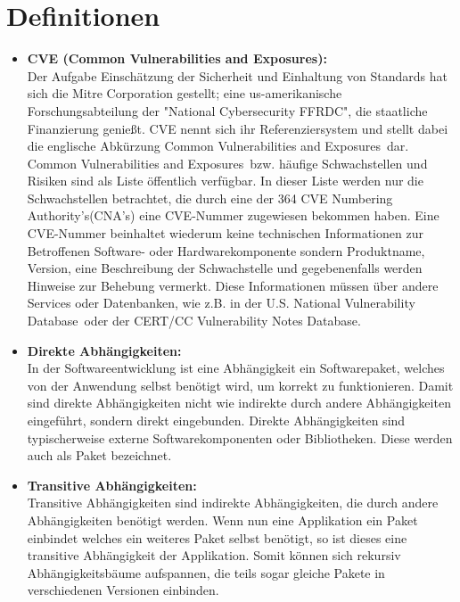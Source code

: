 \section{Definitionen} \label{sec:Definitionen}
\begin{itemize}
    \item \textbf{CVE (Common Vulnerabilities and Exposures):} \\
    
    Der Aufgabe Einschätzung der Sicherheit und Einhaltung von Standards hat sich die Mitre Corporation gestellt; eine us-amerikanische Forschungsabteilung der "National Cybersecurity FFRDC", die staatliche Finanzierung genießt.
    CVE nennt sich ihr Referenziersystem und stellt dabei die englische Abkürzung \glqq Common Vulnerabilities and Exposures\grqq~dar.
    \\
    \glqq Common Vulnerabilities and Exposures\grqq~bzw. häufige Schwachstellen und Risiken sind als Liste öffentlich verfügbar.
    In dieser Liste werden nur die Schwachstellen betrachtet, die durch eine der 364 \glqq CVE Numbering Authority's\grqq (CNA's) eine CVE-Nummer zugewiesen bekommen haben.\cite{}
    Eine CVE-Nummer beinhaltet wiederum keine technischen Informationen zur Betroffenen Software- oder Hardwarekomponente sondern Produktname, Version, eine Beschreibung der Schwachstelle und gegebenenfalls werden Hinweise zur Behebung vermerkt.
    Diese Informationen müssen über andere Services oder Datenbanken, wie z.B. in der \glqq U.S. National Vulnerability Database\grqq~oder der \glqq CERT/CC Vulnerability Notes Database\grqq.

    \item \textbf{Direkte Abhängigkeiten:} \\
    In der Softwareentwicklung ist eine Abhängigkeit ein Softwarepaket, welches von der Anwendung selbst benötigt wird, um korrekt zu funktionieren.
    Damit sind direkte Abhängigkeiten nicht wie indirekte durch andere Abhängigkeiten eingeführt, sondern direkt eingebunden.
    Direkte Abhängigkeiten sind typischerweise externe Softwarekomponenten oder Bibliotheken.
    Diese werden auch als Paket bezeichnet. 

    \item \textbf{Transitive Abhängigkeiten:} \\
    Transitive Abhängigkeiten sind indirekte Abhängigkeiten, die durch andere Abhängigkeiten benötigt werden.
    Wenn nun eine Applikation ein Paket einbindet welches ein weiteres Paket selbst benötigt, so ist dieses eine transitive Abhängigkeit der Applikation.
    Somit können sich rekursiv Abhängigkeitsbäume aufspannen, die teils sogar gleiche Pakete in verschiedenen Versionen einbinden.
    

\end{itemize}
